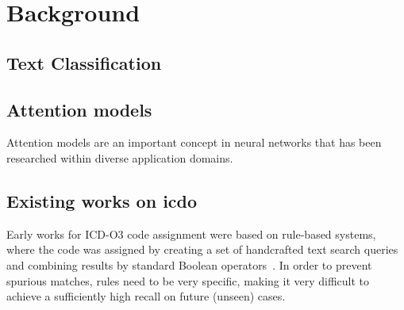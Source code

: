 \chapter{Background}
\label{ch:background}

\section{Text Classification}

\section{Attention models}
Attention models are an important concept in neural networks that has
been researched within diverse application domains.

\section{Existing works on \ac{icdo}}
Early works for ICD-O3 code assignment were based on rule-based
systems, where the code was assigned by creating a set of handcrafted
text search queries and combining results by standard Boolean
operators~\cite{crocetti_automatic_2004}. In order to prevent spurious
matches, rules need to be very specific, making it very difficult to
achieve a sufficiently high recall on future (unseen) cases.

